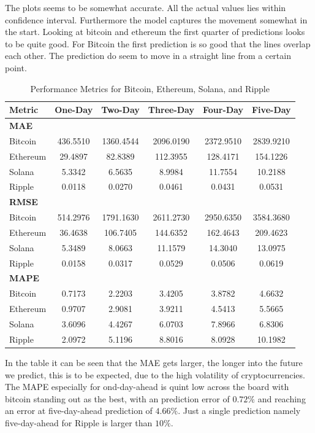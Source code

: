 \noindent The plots seems to be somewhat accurate. All the actual values lies within confidence interval. Furthermore the model captures the movement somewhat in the start. Looking at bitcoin and ethereum the first quarter of predictions looks to be quite good. For Bitcoin the first prediction is so good that the lines overlap each other. The prediction do seem to move in a straight line from a certain point.

\begin{table}[H]
\centering
\caption{Performance Metrics for Bitcoin, Ethereum, Solana, and Ripple}
\begin{tabular}{lccccc}
\toprule
\textbf{Metric} & \textbf{One-Day} & \textbf{Two-Day} & \textbf{Three-Day} & \textbf{Four-Day} & \textbf{Five-Day} \\
\midrule
\textbf{MAE} & & & & & \\
Bitcoin   & 436.5510 & 1360.4544 & 2096.0190 & 2372.9510 & 2839.9210 \\
Ethereum  &  29.4897 &   82.8389 &  112.3955 &  128.4171 &  154.1226 \\
Solana    &   5.3342 &    6.5635 &    8.9984 &   11.7554 &   10.2188 \\
Ripple    &   0.0118 &    0.0270 &    0.0461 &    0.0431 &    0.0531 \\
\midrule
\textbf{RMSE} & & & & & \\
Bitcoin   & 514.2976 & 1791.1630 & 2611.2730 & 2950.6350 & 3584.3680 \\
Ethereum  &  36.4638 &  106.7405 &  144.6352 &  162.4643 &  209.4623 \\
Solana    &   5.3489 &    8.0663 &   11.1579 &   14.3040 &   13.0975 \\
Ripple    &   0.0158 &    0.0317 &    0.0529 &    0.0506 &    0.0619 \\
\midrule
\textbf{MAPE} & & & & & \\
Bitcoin   &   0.7173 &    2.2203 &    3.4205 &    3.8782 &    4.6632 \\
Ethereum  &   0.9707 &    2.9081 &    3.9211 &    4.5413 &    5.5665 \\
Solana    &   3.6096 &    4.4267 &    6.0703 &    7.8966 &    6.8306 \\
Ripple    &   2.0972 &    5.1196 &    8.8016 &    8.0928 &   10.1982 \\
\bottomrule
\end{tabular}
\label{fig:johansen_RMSE_MAE_MAPE}
\end{table}
\noindent In the table it can be seen that the MAE gets larger, the longer into the future we predict, this is to be expected, due to the high volatility of cryptocurrencies. The MAPE especially for ond-day-ahead is quint low across the board with bitcoin standing out as the best, with an prediction error of $0.72\%$ and reaching an error at five-day-ahead prediction of $4.66\%$. Just a single prediction namely five-day-ahead for Ripple is larger than $10\%$.\\


